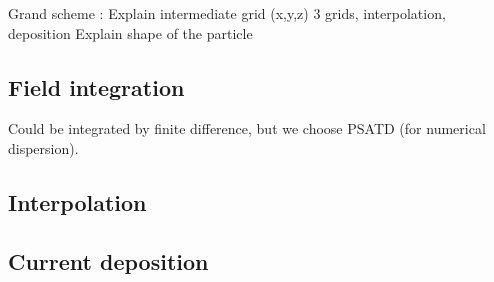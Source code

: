 \documentclass[a4paper]{article}   	%
\begin{document}
Grand scheme :
Explain intermediate grid (x,y,z)
3 grids, interpolation, deposition 
Explain shape of the particle

\subsection{Field integration}

Could be integrated by finite difference, but we choose PSATD (for numerical dispersion).

\subsection{Interpolation} 

\subsection{Current deposition}


\newpage
\appendix





\end{document}

